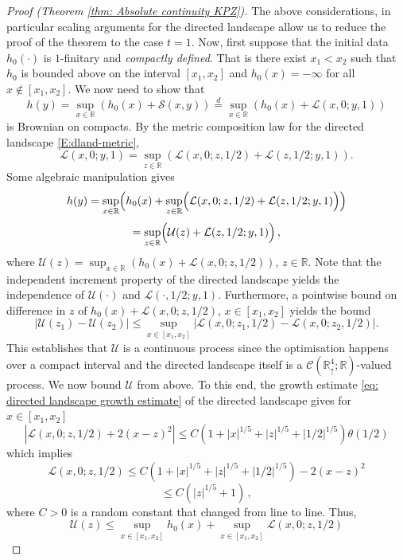 \documentclass[12pt]{report}
\theoremstyle{plain}
\newcommand{\R}{\ensuremath{\mathbb{R}}}
\begin{document}
\begin{proof}[Proof (Theorem \ref{thm: Absolute continuity KPZ})]
    
    The above considerations, in particular scaling arguments for the directed landscape allow us to reduce the proof of the theorem to the case $t=1$. Now, first suppose that the initial data $h_0(\cdot)$ is $1$-finitary and \textit{compactly defined}. That is there exist  $x_1<x_2$ such that $h_0$ is bounded above on the interval $[x_1,x_2]$ and $h_0(x)=-\infty$ for all $x\not\in[x_1,x_2]$. We now need to show that 
    \[
    h(y) = \sup_{x\in\R}(h_0(x)+\mathcal{S}(x,y)) \stackrel{d}{=} \sup_{x\in\R}(h_0(x)+\mathcal{L}(x,0;y,1))
    \]
    is Brownian on compacts. By the metric composition law for the directed landscape \ref{E:dland-metric},\newline 
    \[
    \mathcal{L}(x,0;y,1) = \displaystyle\sup_{z\in\R}(\mathcal{L}(x,0;z,1/2)+\mathcal{L}(z,1/2;y,1)).
    \]
    Some algebraic manipulation gives
    \[
    h(y) = \sup_{x\in\R}\Bigl(h_0(x)+\displaystyle\sup_{z\in\R}\Bigl(\mathcal{L}(x,0;z,1/2)+\mathcal{L}(z,1/2;y,1)\Bigr)\Bigr) 
    \]
    \[
    = \displaystyle\sup_{z\in\R}\Bigl(\mathcal{U}(z)+\mathcal{L}(z,1/2;y,1)\Bigr)\,,
    \]
    where $\mathcal{U}(z) = \displaystyle\sup_{x\in\R}(h_0(x)+\mathcal{L}(x,0;z,1/2))$, $z\in\R$. Note that the independent increment property of the directed landscape yields the independence of $\mathcal{U}(\cdot)$ and $\mathcal{L}(\cdot,1/2;y,1)$. Furthermore, a pointwise bound on difference in $z$ of $h_0(x)+\mathcal{L}(x,0;z,1/2)$, $x\in [x_1, x_2]$ yields the bound
    \[
    |\mathcal{U}(z_1)-\mathcal{U}(z_2)|\leq \displaystyle\sup_{x\in[x_1,x_2]}|\mathcal{L}(x,0;z_1,1/2)-\mathcal{L}(x,0;z_2,1/2)|.
    \]
    This establishes that $\mathcal{U}$ is a continuous process since the optimisation happens over a compact interval and the directed landscape itself is a $\mathcal{C}(\R^4_{\uparrow};\R)$-valued process. We now bound $\mathcal{U}$ from above. To this end, the growth estimate \ref{eq: directed landscape growth estimate} of the directed landscape gives for $x\in[x_1, x_2]$
    \[
    |\mathcal{L}(x,0;z,1/2) + 2(x-z)^2| \leq C(1+|x|^{1/5}+|z|^{1/5}+|1/2|^{1/5})\theta(1/2)
    \]
    which implies
    \[
    \mathcal{L}(x,0;z,1/2) \leq C(1+|x|^{1/5}+|z|^{1/5}+|1/2|^{1/5}) - 2(x-z)^2
    \]
    \[
    \leq C(|z|^{1/5}+1)\,,
    \]
    where $C>0$ is a random constant that changed from line to line. Thus,
    \[
    \mathcal{U}(z)\leq \displaystyle\sup_{x\in[x_1,x_2]}h_0(x)+\displaystyle\sup_{x\in[x_1,x_2]}\mathcal{L}(x,0;z,1/2)
\]
\end{proof}
\end{document}
